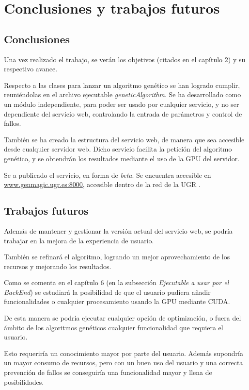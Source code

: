\chapter{Conclusiones y trabajos futuros}


\bigskip
\section{Conclusiones}
\bigskip

Una vez realizado el trabajo, se verán los objetivos (citados en el capítulo 2) y su respectivo avance.

\bigskip
Respecto a las clases para lanzar un algoritmo genético se han logrado cumplir, reuniéndolas en el archivo ejecutable \textit{geneticAlgorithm}. Se ha desarrollado como un módulo independiente, para poder ser usado por cualquier servicio, y no ser dependiente del servicio web, controlando la entrada de parámetros y control de fallos.

\bigskip
También se ha creado la estructura del servicio web, de manera que sea accesible desde cualquier servidor web.
Dicho servicio facilita la petición del algoritmo genético, y se obtendrán los resultados mediante el uso de la GPU del servidor.

\bigskip
Se a publicado el servicio, en forma de \textit{beta}. Se encuentra accesible en
\textcolor{blue}{\underline{\href{http://genmagic.ugr.es:8000}{www.genmagic.ugr.es:8000}}}, accesible dentro de la red de la UGR \cite{vpnugr}.
	

\section{Trabajos futuros}

\bigskip
Además de mantener y gestionar la versión actual del servicio web, se podría trabajar en la mejora de la experiencia de usuario.

\bigskip
También se refinará el algoritmo, logrando un mejor aprovechamiento de los recursos y mejorando los resultados.

\bigskip
Como se comenta en el capítulo 6 (en la subsección \textit{Ejecutable a usar por el BackEnd}) se estudiará la posibilidad de que el usuario pudiera añadir funcionalidades o cualquier procesamiento usando la GPU mediante CUDA. 

\bigskip
De esta manera se podría ejecutar cualquier opción de optimización, o fuera del ámbito de los algoritmos genéticos cualquier funcionalidad que requiera el usuario.

\bigskip
Esto requeriría un conocimiento mayor por parte del usuario. Además supondría un mayor consumo de recursos, pero con un buen uso del usuario y una correcta prevención de fallos se conseguiría una funcionalidad mayor y llena de posibilidades. 








